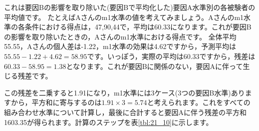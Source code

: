 \documentclass{ltjbook}
\begin{document}
これは要因Bの影響を取り除いた(要因Bで平均化した)要因A水準別の各被験者の平均値です。
たとえばAさんのm1水準の値を考えてみましょう。Aさんのm1水準の各条件における得点は，47,90,44で，平均は60.33になります。これが要因Bの影響を取り除いたときの，Aさんのm1水準における得点です。
全体平均55.55，Aさんの個人差は-1.22，m1水準の効果は4.62ですから，予測平均は$55.55-1.22+4.62=58.95$です。いっぽう，実際の平均は60.33ですから，残差は$60.33-58.95=1.38$となります。これが要因Bに関係のない，要因Aに伴って生じる残差です。

この残差を二乗すると1.91になり，m1水準には3ケース(3つの要因B水準)ありますから，平方和に寄与するのは$1.91\times 3=5.74$と考えられます。これをすべての組み合わせ水準について計算し，最後に合計すると要因Aに伴う残差の平方和1603.35が得られます。計算のステップを表\ref{tbl:21_10}に示します。
\end{document}
